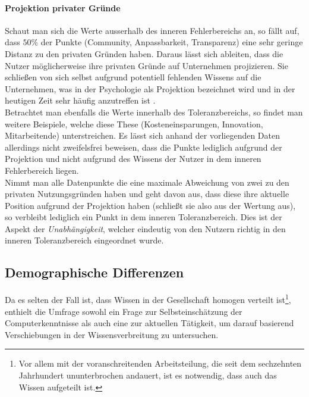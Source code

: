 \documentclass[a4paper]{article}
\begin{document}
                \paragraph{Projektion privater Gründe}
                    Schaut man sich die Werte ausserhalb des inneren Fehlerbereichs an, so fällt auf, dass $50 \%$ der Punkte ({\scriptsize Community, Anpassbarkeit, Transparenz}) eine sehr geringe Distanz zu den privaten Gründen haben. Daraus lässt sich ableiten, dass die Nutzer möglicherweise ihre privaten Gründe auf Unternehmen projizieren. Sie schließen von sich selbst aufgrund potentiell fehlenden Wissens auf die Unternehmen, was in der Psychologie als Projektion bezeichnet wird und in der heutigen Zeit sehr häufig anzutreffen ist \cite{psychology:freud-defense-projection}.\\
                    Betrachtet man ebenfalls die Werte innerhalb des Toleranzbereichs, so findet man weitere Beispiele, welche diese These ({\scriptsize Kosteneinsparungen, Innovation, Mitarbeitende}) unterstreichen. Es lässt sich anhand der vorliegenden Daten allerdings nicht zweifelsfrei beweisen, dass die Punkte lediglich aufgrund der Projektion und nicht aufgrund des Wissens der Nutzer in dem inneren Fehlerbereich liegen.\\
                    Nimmt man alle Datenpunkte die eine maximale Abweichung von zwei zu den privaten Nutzungsgründen haben und geht davon aus, dass diese ihre aktuelle Position aufgrund der Projektion haben (schließt sie also aus der Wertung aus), so verbleibt lediglich ein Punkt in dem inneren Toleranzbereich. Dies ist der Aspekt der \emph{Unabhängigkeit}, welcher eindeutig von den Nutzern richtig in den inneren Toleranzbereich eingeordnet wurde.
    
        \subsection{Demographische Differenzen}
            Da es selten der Fall ist, dass Wissen in der Gesellschaft homogen verteilt ist\footnote{Vor allem mit der voranschreitenden Arbeitsteilung, die seit dem sechzehnten Jahrhundert ununterbrochen andauert, ist es notwendig, dass auch das Wissen aufgeteilt ist\cite{mckeon:divison_of_knowledge}.}, enthielt die Umfrage sowohl ein Frage zur Selbsteinschätzung der Computerkenntnisse als auch eine zur aktuellen Tätigkeit, um darauf basierend Verschiebungen in der Wissensverbreitung zu untersuchen.
            
\end{document}
